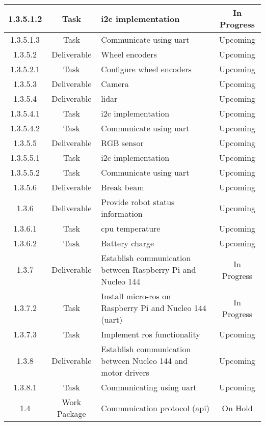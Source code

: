 \begin{longtable}{|c|c|m{}|c|}
    \rowcolor{p} 1.3.5.1.2 & Task & \acs{i2c} implementation & In Progress \\ \hline
    \rowcolor{u} 1.3.5.1.3 & Task & Communicate using \acs{uart} & Upcoming \\ \hline
    \rowcolor{u} 1.3.5.2 & Deliverable & Wheel encoders & Upcoming \\ \hline
    \rowcolor{u} 1.3.5.2.1 & Task & Configure wheel encoders & Upcoming \\ \hline
    \rowcolor{u} 1.3.5.3 & Deliverable & Camera & Upcoming \\ \hline
    \rowcolor{u} 1.3.5.4 & Deliverable & \acs{lidar} & Upcoming \\ \hline
    \rowcolor{u} 1.3.5.4.1 & Task & \acs{i2c} implementation & Upcoming \\ \hline
    \rowcolor{u} 1.3.5.4.2 & Task & Communicate using \acs{uart} & Upcoming \\ \hline
    \rowcolor{u} 1.3.5.5 & Deliverable & RGB sensor & Upcoming \\ \hline
    \rowcolor{u} 1.3.5.5.1 & Task & \acs{i2c} implementation & Upcoming \\ \hline
    \rowcolor{u} 1.3.5.5.2 & Task & Communicate using \acs{uart} & Upcoming \\ \hline
    \rowcolor{u} 1.3.5.6 & Deliverable & Break beam & Upcoming \\ \hline
    \rowcolor{u} 1.3.6 & Deliverable & Provide robot status information & Upcoming \\ \hline
    \rowcolor{u} 1.3.6.1 & Task & \acs{cpu} temperature & Upcoming \\ \hline
    \rowcolor{u} 1.3.6.2 & Task & Battery charge & Upcoming \\ \hline
    \rowcolor{p} 1.3.7 & Deliverable & Establish communication between Raspberry Pi and Nucleo 144 & In Progress \\ \hline
    \rowcolor{p} 1.3.7.2 & Task & Install micro-\acs{ros} on Raspberry Pi and Nucleo 144 (\acs{uart}) & In Progress \\ \hline
    \rowcolor{u} 1.3.7.3 & Task & Implement \acs{ros} functionality & Upcoming \\ \hline
    \rowcolor{u} 1.3.8 & Deliverable & Establish communication between Nucleo 144 and motor drivers & Upcoming \\ \hline
    \rowcolor{u} 1.3.8.1 & Task & Communicating using \acs{uart} & Upcoming \\ \hline
    \rowcolor{h} 1.4 & Work Package & Communication protocol (\acs{api}) & On Hold \\ \hline

\end{longtable}
